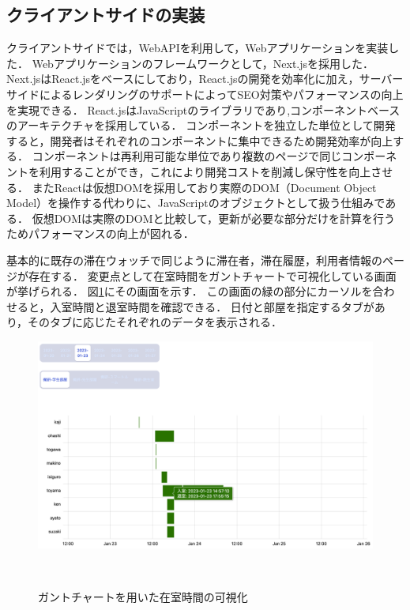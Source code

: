 

\subsection{クライアントサイドの実装}\label{4.1.2}
クライアントサイドでは，WebAPIを利用して，Webアプリケーションを実装した．
Webアプリケーションのフレームワークとして，Next.jsを採用した．
Next.jsはReact.jsをベースにしており，React.jsの開発を効率化に加え，サーバーサイドによるレンダリングのサポートによってSEO対策やパフォーマンスの向上を実現できる．
React.jsはJavaScriptのライブラリであり,コンポーネントベースのアーキテクチャを採用している．
コンポーネントを独立した単位として開発すると，開発者はそれぞれのコンポーネントに集中できるため開発効率が向上する．
コンポーネントは再利用可能な単位であり複数のページで同じコンポーネントを利用することができ，これにより開発コストを削減し保守性を向上させる．
またReactは仮想DOMを採用しており実際のDOM（Document Object Model）を操作する代わりに、JavaScriptのオブジェクトとして扱う仕組みである．
仮想DOMは実際のDOMと比較して，更新が必要な部分だけを計算を行うためパフォーマンスの向上が図れる．



基本的に既存の滞在ウォッチで同じように滞在者，滞在履歴，利用者情報のページが存在する．
変更点として在室時間をガントチャートで可視化している画面が挙げられる．
図\ref{fig:gantt}にその画面を示す．
この画面の緑の部分にカーソルを合わせると，入室時間と退室時間を確認できる．
日付と部屋を指定するタブがあり，そのタブに応じたそれぞれのデータを表示される．

\begin{figure}[tbh]
  \centering
  \includegraphics[width=13cm]{image/gantt.png}
  \caption{ガントチャートを用いた在室時間の可視化}　\label{fig:gantt}
\end{figure}



